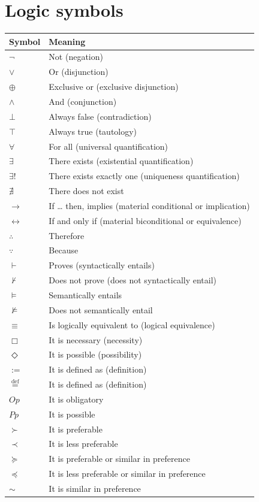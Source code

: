 \documentclass[11pt]{article}
\newcommand{\defequal}{\stackrel{\scriptscriptstyle\mathrm{def}}{=}}
\begin{document}
\section{Logic symbols}
\label{sec:org30622ba}
\begin{center}
\begin{tabular}{l|l}
Symbol & Meaning\\
\hline
\(\neg\) & Not (negation)\\
\(\vee\) & Or (disjunction)\\
\(\oplus\) & Exclusive or (exclusive disjunction)\\
\(\wedge\) & And (conjunction)\\
\(\bot\) & Always false (contradiction)\\
\(\top\) & Always true (tautology)\\
\(\forall\) & For all (universal quantification)\\
\(\exists\) & There exists (existential quantification)\\
\(\exists !\) & There exists exactly one (uniqueness quantification)\\
\(\nexists\) & There does not exist\\
\(\rightarrow\) & If \ldots{} then, implies (material conditional or implication)\\
\(\leftrightarrow\) & If and only if (material biconditional or equivalence)\\
\(\therefore\) & Therefore\\
\(\because\) & Because\\
\(\vdash\) & Proves (syntactically entails)\\
\(\nvdash\) & Does not prove (does not syntactically entail)\\
\(\vDash\) & Semantically entails\\
\(\nvDash\) & Does not semantically entail\\
\(\equiv\) & Is logically equivalent to (logical equivalence)\\
\(\Box\) & It is necessary (necessity)\\
\(\Diamond\) & It is possible (possibility)\\
\(:=\) & It is defined as (definition)\\
\(\defequal\) & It is defined as (definition)\\
\(Op\) & It is obligatory\\
\(Pp\) & It is possible\\
\(\succ\) & It is preferable\\
\(\prec\) & It is less preferable\\
\(\succeq\) & It is preferable or similar in preference\\
\(\preceq\) & It is less preferable or similar in preference\\
\(\sim\) & It is similar in preference\\
\end{tabular}
\end{center}
\end{document}
